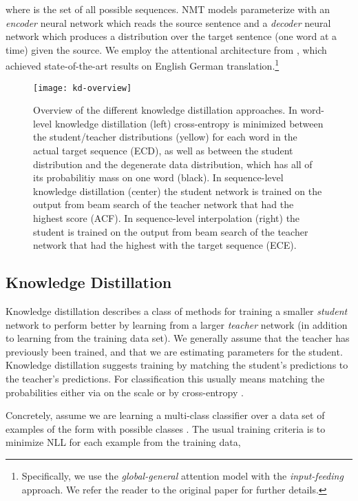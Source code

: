 \documentclass[11pt,letterpaper]{article}
\begin{document}
where  is the set of all possible sequences.
NMT models parameterize  
with an \textit{encoder} neural network which reads the source sentence and a \textit{decoder}
neural network which produces a distribution over the target sentence (one word at a time) given the source. 
We employ the attentional architecture from 
, which achieved state-of-the-art results on English 
German translation.\footnote{Specifically, we use the \textit{global-general} attention model
with the \textit{input-feeding} approach. We refer the reader to the original paper for further details.}







\begin{figure*}[htp]\label{fig1}
\centering
\texttt{[image: kd-overview]}
\caption{Overview of the different knowledge distillation approaches.
In word-level knowledge distillation (left) cross-entropy is minimized between the
  student/teacher distributions (yellow) for each word in the actual target sequence (\textsf{ECD}), as well as
  between the student distribution and the degenerate data distribution, which has all of its
  probabilitiy mass on one word (black). In sequence-level knowledge distillation (center)
  the student network is trained on the output from beam search of the teacher network that
  had the highest score (\textsf{ACF}). In sequence-level interpolation (right) the student is trained on the output
 from beam search of the teacher network that had the highest  with the target sequence (\textsf{ECE}).}
\end{figure*}
\subsection{Knowledge Distillation}\label{KD}

Knowledge distillation describes a class of methods for training a
smaller \textit{student} network to perform better by learning from a
larger \textit{teacher} network (in addition to learning from the
training data set). We generally assume that the teacher has previously
been trained, and that we are estimating parameters for the student.
Knowledge distillation suggests training by matching the student's
predictions to the teacher's predictions. For classification this
usually means matching the probabilities either via  on the
 scale \cite{Ba2014} or by cross-entropy
\cite{Li2014,Hinton2015}.

Concretely, assume we are learning a multi-class classifier over 
 a data set of examples of the form  
with possible classes . The usual training criteria is to minimize NLL for each example 
from the 
training data,  
\end{document}
